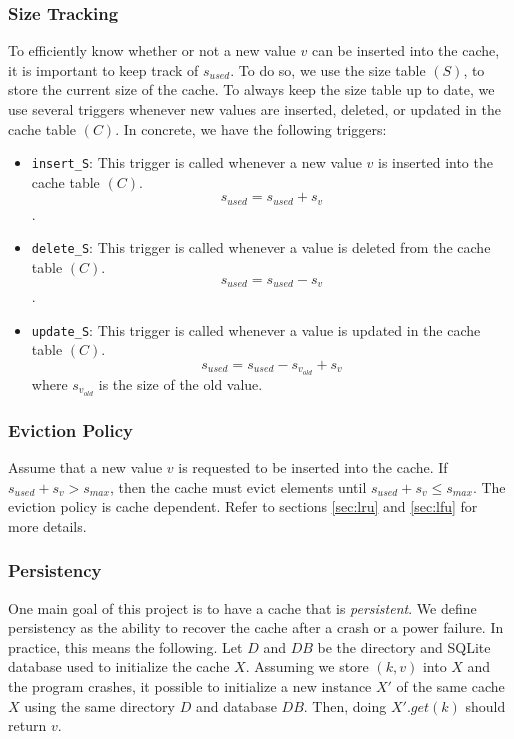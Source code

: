 \documentclass[11pt, journal]{IEEEtran}
\begin{document}
\subsubsection{Size Tracking}
To efficiently know whether or not a new value $v$ can be inserted into the cache,
it is important to keep track of $s_{used}$. To do so, we use the size table $(S)$,
to store the current size of the cache. To always keep the size table up to date,
we use several triggers whenever new values are inserted, deleted, or
updated in the cache table $(C)$. In concrete, we have the following triggers:
\begin{itemize}
    \item \texttt{insert\_S}: This trigger is called whenever a new value $v$
        is inserted into the cache table $(C)$. $$s_{used} = s_{used} + s_v$$.
    \item \texttt{delete\_S}: This trigger is called whenever a value
        is deleted from the cache table $(C)$.
        $$s_{used} = s_{used} - s_v$$.
    \item \texttt{update\_S}: This trigger is called whenever a value
        is updated in the cache table $(C)$.
        $$s_{used} = s_{used} - s_{v_{old}} + s_v$$
        where $s_{v_{old}}$ is the size of the old value.
\end{itemize}

\subsubsection{Eviction Policy}
Assume that a new value $v$ is requested to be inserted into the cache.
If $s_{used} + s_v > s_{max}$, then the cache must evict elements
until $s_{used} + s_v \leq s_{max}$. The eviction policy is cache dependent.
Refer to sections \ref{sec:lru} and \ref{sec:lfu} for more details.

\subsubsection{Persistency}
One main goal of this project is to have a cache that is \textit{persistent}.
We define persistency as the ability to recover the cache
after a crash or a power failure. In practice, this means the following.
Let $D$ and $DB$ be the directory and SQLite database used to initialize
the cache $X$. Assuming we store $(k, v)$ into $X$ and the program crashes,
it possible to initialize a new instance $X'$ of the same cache $X$ using the same
directory $D$ and database $DB$. Then, doing $X'.get(k)$ should return $v$.
\end{document}
